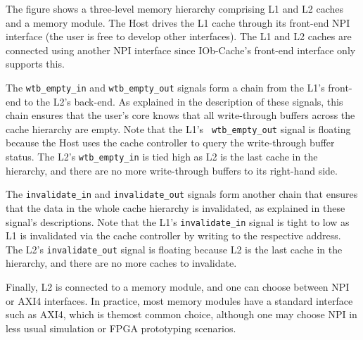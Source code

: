 %

The figure shows a three-level memory hierarchy comprising L1 and L2 caches and
a memory module. The Host drives the L1 cache through its front-end NPI
interface (the user is free to develop other interfaces).  The L1 and L2 caches
are connected using another NPI interface since IOb-Cache's front-end interface
only supports this.

The {\tt wtb\_empty\_in} and {\tt wtb\_empty\_out} signals form a chain from the
L1's front-end to the L2's back-end. As explained in the description of these
signals, this chain ensures that the user's core knows that all write-through
buffers across the cache hierarchy are empty. Note that the L1's {\tt
  wtb\_empty\_out} signal is floating because the Host uses the cache controller
to query the write-through buffer status. The L2's {\tt wtb\_empty\_in} is tied
high as L2 is the last cache in the hierarchy, and there are no more
write-through buffers to its right-hand side.

The {\tt invalidate\_in} and {\tt invalidate\_out} signals form another chain that
ensures that the data in the whole cache hierarchy is invalidated, as explained
in these signal's descriptions. Note that the L1's {\tt invalidate\_in} signal is
tight to low as L1 is invalidated via the cache controller by writing to the
respective address. The L2's {\tt invalidate\_out} signal is floating because L2
is the last cache in the hierarchy, and there are no more caches to invalidate.

Finally, L2 is connected to a memory module, and one can choose between NPI or
AXI4 interfaces. In practice, most memory modules have a standard interface such
as AXI4, which is themost common choice, although one may choose NPI in less
usual simulation or FPGA prototyping scenarios.


